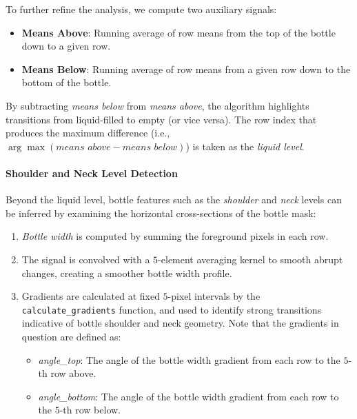 \documentclass[a4paper,12pt]{article}
\begin{document}
To further refine the analysis, we compute two auxiliary signals:
\begin{itemize}
    \item \textbf{Means Above}: Running average of row means from the top of the bottle down to a given row.
    \item \textbf{Means Below}: Running average of row means from a given row down to the bottom of the bottle.
\end{itemize}
By subtracting \textit{means below} from \textit{means above}, the algorithm highlights transitions from liquid-filled to empty (or vice versa). The row index that produces the maximum difference (i.e., \(\arg\max(\textit{means above} - \textit{means below})\)) is taken as the \emph{liquid level}.

\paragraph{Shoulder and Neck Level Detection}

Beyond the liquid level, bottle features such as the \emph{shoulder} and \emph{neck} levels can be inferred by examining the horizontal cross-sections of the bottle mask:
\begin{enumerate}
    \item \textit{Bottle width} is computed by summing the foreground pixels in each row. 
    \item The signal is convolved with a \(5\)-element averaging kernel to smooth abrupt changes, creating a smoother bottle width profile.
    \item Gradients are calculated at fixed \(5\)-pixel intervals by the \texttt{calculate\_gradients} function, and used to identify strong transitions indicative of bottle shoulder and neck geometry. Note that the gradients in question are defined as:
    \begin{itemize}
        \item \textit{angle\_top}: The angle of the bottle width gradient from each row to the \(5\)-th row above.
        \item \textit{angle\_bottom}: The angle of the bottle width gradient from each row to the \(5\)-th row below.
    \end{itemize}
\end{enumerate}
\end{document}
